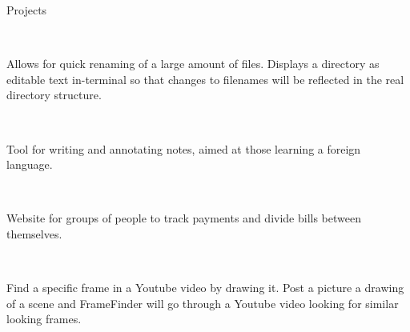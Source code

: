 \documentclass[]{deedy-resume-openfont}
\begin{document}
%
%
\begin{resumesection}{Projects}

\hfill {}\\
\begin{addmargin}[1em]{0pt}
Allows for quick renaming of a large amount of files. Displays a directory as editable text in-terminal so that changes to filenames will be reflected in the real directory structure.\\
\end{addmargin}
\vspace{4pt}

\iffalse
\runsubsection{\large{GraphIt}}
\descript{| Java}\hfill \location{github.com/ivlin/GraphIt}\\
\begin{addmargin}[1em]{0pt}
An interactive graphing utility that allows a user to click on a graph and its nodes to add, remove, or move points. The graph respond by graphically visualizing statistical measures about the dataset.\\
\end{addmargin}
\vspace{4pt}
\fi

\hfill {}\\
\begin{addmargin}[1em]{0pt}
Tool for writing and annotating notes, aimed at those learning a foreign language.\\
\end{addmargin}
\vspace{4pt}

\hfill {}\\
\begin{addmargin}[1em]{0pt}
Website for groups of people to track payments and divide bills between themselves.\\
\end{addmargin}
\vspace{4pt}

\hfill {}\\
\begin{addmargin}[1em]{0pt}
Find a specific frame in a Youtube video by drawing it. Post a picture a drawing of a scene and FrameFinder will go through a Youtube video looking for similar looking frames.
\end{addmargin}
\vspace{-3pt}
\end{resumesection}
%
%
\end{document}
